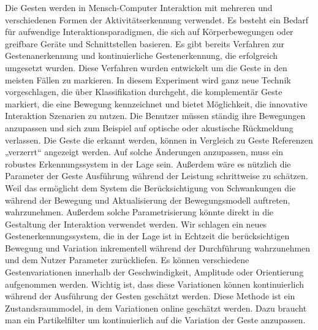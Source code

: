 \documentclass{llncs}
\begin{document}
Die Gesten werden in Mensch-Computer Interaktion mit mehreren und verschiedenen Formen der Aktivitätserkennung verwendet. Es besteht ein Bedarf  für aufwendige Interaktionsparadigmen, die sich auf Körperbewegungen oder greifbare Geräte und Schnittstellen basieren. Es gibt bereits Verfahren zur Gestenanerkennung und kontinuierliche Gestenerkennung, die erfolgreich umgesetzt wurden. Diese Verfahren wurden entwickelt um die Geste in den meisten Fällen zu markieren. In diesem Experiment wird ganz neue Technik vorgeschlagen, die über Klassifikation durchgeht, die komplementär Geste markiert, die eine Bewegung kennzeichnet und bietet Möglichkeit, die innovative Interaktion Szenarien zu nutzen.
Die Benutzer müssen  ständig ihre Bewegungen anzupassen und sich zum Beispiel auf optische oder akustische Rückmeldung verlassen. Die Geste die erkannt werden, können in Vergleich zu Geste Referenzen „verzerrt“ angezeigt werden. Auf solche Änderungen anzupassen, muss ein robustes Erkennungssystem in der Lage sein. Außerdem wäre es nützlich die Parameter der Geste Ausführung während der Leistung schrittweise zu schätzen. Weil das ermöglicht dem System die Berücksichtigung von Schwankungen die während der Bewegung und Aktualisierung der Bewegungsmodell auftreten,  wahrzunehmen. Außerdem solche Parametrisierung  könnte direkt in die Gestaltung der Interaktion verwendet werden.
Wir schlagen ein neues Gestenerkennungssystem, die in der Lage ist in Echtzeit die berücksichtigen Bewegung und Variation inkrementell während der Durchführung wahrzunehmen und dem Nutzer Parameter zurückliefen. Es können verschiedene Gestenvariationen innerhalb der Geschwindigkeit, Amplitude oder Orientierung aufgenommen werden. Wichtig ist, dass diese Variationen können kontinuierlich während der Ausführung der Gesten geschätzt werden. Diese Methode ist ein Zustandsraummodel, in dem Variationen online geschätzt werden. Dazu braucht man ein Partikelfilter um kontinuierlich auf die Variation der Geste anzupassen.
\end{document}
